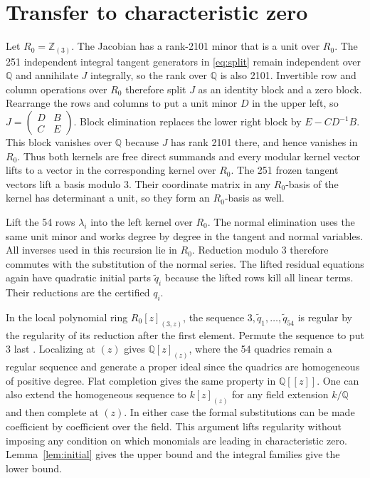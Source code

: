 \documentclass[11pt]{amsart}
\newcommand{\Q}{\mathbb Q}
\newcommand{\Z}{\mathbb Z}
\begin{document}
\section{Transfer to characteristic zero}\label{sec:lift}

Let $R_0=\Z_{(3)}$. The Jacobian has a rank-2101 minor that is a
unit over $R_0$. The 251 independent integral tangent generators
in \eqref{eq:split} remain independent over $\Q$ and annihilate
$J$ integrally, so the rank over $\Q$ is also 2101. Invertible
row and column operations over $R_0$ therefore split $J$ as an
identity block and a zero block. Rearrange the rows and columns
to put a unit minor $D$ in the upper left, so
$J=\left(\begin{smallmatrix}D&B\\C&E\end{smallmatrix}\right)$.
Block elimination replaces the lower right block by
$E-CD^{-1}B$. This block vanishes over $\Q$ because $J$ has rank 2101
there, and hence vanishes in $R_0$. Thus both kernels are free
direct summands and every modular kernel vector lifts to a vector
in the corresponding kernel over $R_0$.
The 251 frozen tangent vectors lift a basis modulo 3.
Their coordinate matrix in any $R_0$-basis of the kernel has
determinant a unit, so they form an $R_0$-basis as well.

Lift the 54 rows $\lambda_i$ into the left kernel over $R_0$.
The normal elimination uses the same unit minor and works degree
by degree in the tangent and normal variables. All inverses used in
this recursion lie in $R_0$. Reduction modulo 3 therefore commutes
with the substitution of the normal series. The lifted residual
equations again have quadratic initial parts $\widetilde q_i$
because the lifted rows kill all linear terms. Their reductions
are the certified $q_i$.

In the local polynomial ring $R_0[z]_{(3,z)}$, the sequence
$3,\widetilde q_1,\ldots,
\widetilde q_{54}$ is regular by the regularity of its reduction
after the first element. Permute the sequence to put $3$ last
\cite[Section~10.68]{stacks}. Localizing at $(z)$ gives
$\Q[z]_{(z)}$, where the 54 quadrics remain a regular sequence
and generate a proper ideal since the quadrics are homogeneous
of positive degree. Flat completion gives the same property
in $\Q[[z]]$. One can also extend the homogeneous sequence to
$k[z]_{(z)}$ for any field extension $k/\Q$ and then complete
at $(z)$. In either case the formal substitutions can be made
coefficient by coefficient over the field. This argument lifts
regularity without imposing any condition on which monomials
are leading in characteristic zero. Lemma~\ref{lem:initial}
gives the upper bound and the integral families give the lower bound.
\end{document}
